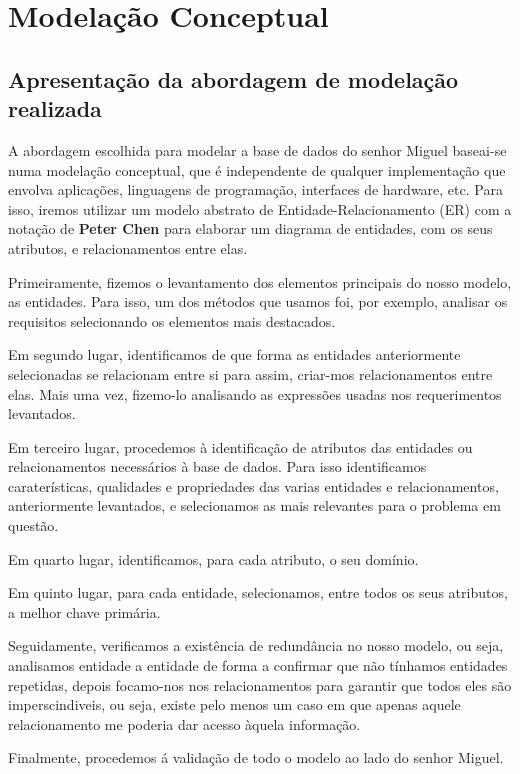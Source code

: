 \chapter{Modelação Conceptual}



\section{Apresentação da abordagem de modelação realizada}

A abordagem escolhida para modelar a base de dados do senhor Miguel baseai-se numa modelação conceptual, que é independente de qualquer implementação que envolva aplicações, linguagens de programação, interfaces de hardware, etc. Para isso, iremos utilizar um modelo abstrato de Entidade-Relacionamento (ER) com a notação de \textbf{Peter Chen} para elaborar um diagrama de entidades, com os seus atributos, e relacionamentos entre elas.\par
Primeiramente, fizemos o levantamento dos elementos principais do nosso modelo, as entidades. Para isso, um dos métodos que usamos foi, por exemplo, analisar os requisitos selecionando os elementos mais destacados.\par
Em segundo lugar, identificamos de que forma as entidades anteriormente selecionadas se relacionam entre si para assim, criar-mos relacionamentos entre elas. Mais uma vez, fizemo-lo  analisando as expressões usadas nos requerimentos levantados.\par
Em terceiro lugar, procedemos à identificação de atributos das entidades ou relacionamentos necessários à base de dados. Para isso identificamos caraterísticas, qualidades e propriedades das varias entidades e relacionamentos, anteriormente levantados, e selecionamos as mais relevantes para o problema em questão.\par
Em quarto lugar, identificamos, para cada atributo, o seu domínio.\par
Em quinto lugar, para cada entidade, selecionamos, entre todos os seus atributos, a melhor chave primária.\par
Seguidamente, verificamos a existência de redundância no nosso modelo, ou seja, analisamos entidade a entidade de forma a confirmar que não tínhamos entidades repetidas, depois focamo-nos nos relacionamentos para garantir que todos eles são imperscindiveis, ou seja, existe pelo menos um caso em que apenas aquele relacionamento me poderia dar acesso àquela informação.\par
Finalmente, procedemos á validação de todo o modelo ao lado do senhor Miguel.

